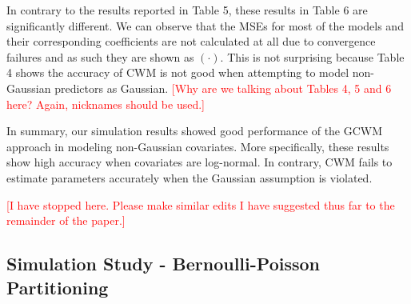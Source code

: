 \documentclass[11pt,letterpaper]{article}
\numberwithin{equation}{section}
\numberwithin{equation}{section}
\numberwithin{equation}{section}
\begin{document}
In contrary to the results reported in Table 5, these results in Table 6 are significantly different. We can observe that the MSEs for most of the models and their corresponding coefficients are not calculated at all due to convergence failures and as such they are shown as $(\cdot)$. This is not surprising because Table 4 shows the accuracy of CWM is not good when attempting to model non-Gaussian predictors as Gaussian. \textcolor{red}{[Why are we talking about Tables 4, 5 and 6 here? Again, nicknames should be used.]}

In summary, our simulation results showed good performance of the GCWM approach in modeling non-Gaussian covariates. More specifically, these results show high accuracy when covariates are log-normal. In contrary, CWM fails to estimate parameters accurately when the Gaussian assumption is violated.

\clearpage\textcolor{red}{[I have stopped here. Please make similar edits I have suggested thus far to the remainder of the paper.]}


\subsection{Simulation Study - Bernoulli-Poisson Partitioning}
\end{document}
